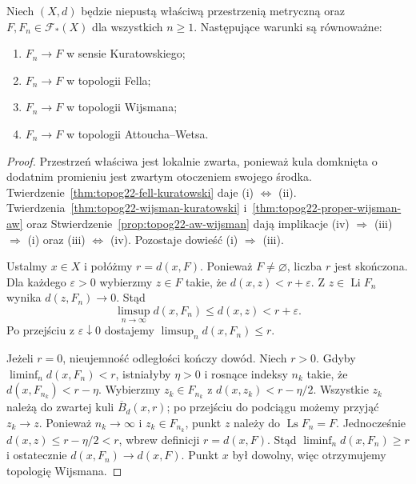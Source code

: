 \begin{twierdzenie}
\label{thm:topog22-proper-equivalences}
Niech \((X,d)\) będzie niepustą właściwą
przestrzenią metryczną oraz
\(F,F_n\in\mathcal F_*(X)\) dla wszystkich \(n\ge1\).
Następujące warunki są równoważne:
\begin{enumerate}[label=\textup{(\roman*)}]
\item \(F_n\to F\) w sensie Kuratowskiego;
\item \(F_n\to F\) w topologii Fella;
\item \(F_n\to F\) w topologii Wijsmana;
\item \(F_n\to F\) w topologii Attoucha--Wetsa.
\end{enumerate}
\end{twierdzenie}
\begin{proof}
Przestrzeń właściwa jest lokalnie zwarta,
ponieważ kula domknięta o dodatnim promieniu
jest zwartym otoczeniem swojego środka.
Twierdzenie~\ref{thm:topog22-fell-kuratowski}
daje \textup{(i)} \(\Leftrightarrow\) \textup{(ii)}.
Twierdzenia~\ref{thm:topog22-wijsman-kuratowski}
i~\ref{thm:topog22-proper-wijsman-aw}
oraz Stwierdzenie~\ref{prop:topog22-aw-wijsman}
dają implikacje \textup{(iv)} \(\Rightarrow\)
\textup{(iii)} \(\Rightarrow\) \textup{(i)}
oraz \textup{(iii)} \(\Leftrightarrow\) \textup{(iv)}.
Pozostaje dowieść \textup{(i)} \(\Rightarrow\) \textup{(iii)}.

Ustalmy \(x\in X\) i połóżmy \(r=d(x,F)\).
Ponieważ \(F\neq\varnothing\), liczba \(r\) jest skończona.
Dla każdego \(\varepsilon>0\) wybierzmy \(z\in F\)
takie, że \(d(x,z)<r+\varepsilon\).
Z \(z\in\operatorname{Li}F_n\)
wynika \(d(z,F_n)\to0\).
Stąd
\[
 \limsup_{n\to\infty}d(x,F_n)
 \le d(x,z)<r+\varepsilon.
\]
Po przejściu z \(\varepsilon\downarrow0\)
dostajemy \(\limsup_nd(x,F_n)\le r\).

Jeżeli \(r=0\), nieujemność odległości
kończy dowód. Niech \(r>0\).
Gdyby \(\liminf_nd(x,F_n)<r\),
istniałyby \(\eta>0\) i rosnące indeksy \(n_k\)
takie, że
\(d(x,F_{n_k})<r-\eta\).
Wybierzmy \(z_k\in F_{n_k}\)
z \(d(x,z_k)<r-\eta/2\).
Wszystkie \(z_k\) należą do zwartej
kuli \(\overline B_d(x,r)\);
po przejściu do podciągu możemy
przyjąć \(z_k\to z\).
Ponieważ \(n_k\to\infty\)
i \(z_k\in F_{n_k}\),
punkt \(z\) należy do
\(\operatorname{Ls}F_n=F\).
Jednocześnie \(d(x,z)\le r-\eta/2<r\),
wbrew definicji \(r=d(x,F)\).
Stąd \(\liminf_nd(x,F_n)\ge r\)
i ostatecznie \(d(x,F_n)\to d(x,F)\).
Punkt \(x\) był dowolny,
więc otrzymujemy topologię Wijsmana.
\end{proof}


